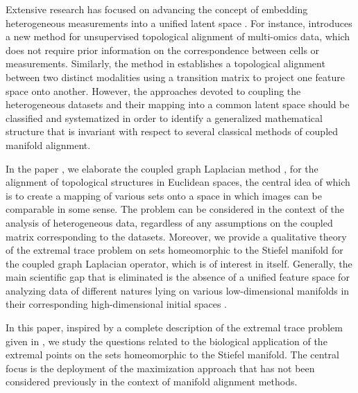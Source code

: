 \documentclass[a4paper,twoside,12pt]{article}
\begin{document}
Extensive research has focused on advancing the  concept of embedding heterogeneous measurements into a unified latent space \cite{Joshua2017,JieLiu2019,Duren2018}. For instance, \cite{KaiCao2020} introduces a new method for unsupervised topological alignment
of  multi-omics data, which  does not require prior information on the correspondence between cells or measurements. Similarly, the method in \cite{Dou2020} establishes a topological alignment between two distinct modalities using a transition matrix to project one feature space onto another. However,   the approaches devoted to coupling the heterogeneous datasets and their mapping into a common latent space should  be classified and systematized in order to identify a generalized  mathematical structure that is invariant with respect to several classical methods of   coupled manifold alignment.




In the paper \cite{KABaChu26}, we elaborate the coupled graph Laplacian method \cite{KABaChu25},\cite{Belkin2003} for the alignment of topological structures in Euclidean spaces, the central idea of which is to create a mapping of various sets onto a space in which images can be comparable in some sense. The problem can be considered in the context of the analysis of heterogeneous data, regardless of any assumptions on the coupled matrix corresponding to the  datasets. Moreover, we provide a qualitative theory of the extremal trace problem on   sets homeomorphic to the Stiefel manifold for the coupled graph Laplacian operator, which is of interest in itself. Generally, the main scientific gap that is   eliminated is the absence of a unified feature space for analyzing data of different natures  lying on various low-dimensional manifolds in their corresponding high-dimensional initial spaces \cite{Ham2003}.

In this paper, inspired by a complete description of the extremal trace problem  given in \cite{KABaChu26},  we  study   the questions related to the biological application of the extremal points on the sets homeomorphic to the Stiefel manifold. The central focus  is the deployment of the maximization approach that  has not been considered previously  in the context  of    manifold  alignment    methods.
\end{document}
